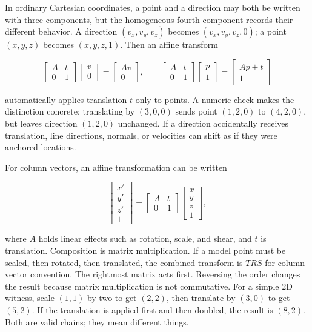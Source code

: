 In ordinary Cartesian coordinates, a point and a direction may both be written with three components, but the homogeneous fourth component records their different behavior. A direction \((v_x,v_y,v_z)\) becomes \((v_x,v_y,v_z,0)\); a point \((x,y,z)\) becomes \((x,y,z,1)\). Then an affine transform

\[
\begin{bmatrix}A&t\\0&1\end{bmatrix}
\begin{bmatrix}v\\0\end{bmatrix}
=
\begin{bmatrix}Av\\0\end{bmatrix},
\qquad
\begin{bmatrix}A&t\\0&1\end{bmatrix}
\begin{bmatrix}p\\1\end{bmatrix}
=
\begin{bmatrix}Ap+t\\1\end{bmatrix}
\]

automatically applies translation \(t\) only to points. A numeric check makes the distinction concrete: translating by \((3,0,0)\) sends point \((1,2,0)\) to \((4,2,0)\), but leaves direction \((1,2,0)\) unchanged. If a direction accidentally receives translation, line directions, normals, or velocities can shift as if they were anchored locations.

For column vectors, an affine transformation can be written

\[
\begin{bmatrix}x'\\y'\\z'\\1\end{bmatrix}=
\begin{bmatrix}A&t\\0&1\end{bmatrix}
\begin{bmatrix}x\\y\\z\\1\end{bmatrix},
\]

where \(A\) holds linear effects such as rotation, scale, and shear, and \(t\) is translation. Composition is matrix multiplication. If a model point must be scaled, then rotated, then translated, the combined transform is \(TRS\) for column-vector convention. The rightmost matrix acts first. Reversing the order changes the result because matrix multiplication is not commutative. For a simple 2D witness, scale \((1,1)\) by two to get \((2,2)\), then translate by \((3,0)\) to get \((5,2)\). If the translation is applied first and then doubled, the result is \((8,2)\). Both are valid chains; they mean different things.

